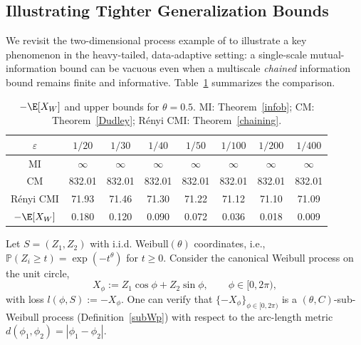 \documentclass[11pt]{article}
\begin{document}
\subsection{Illustrating Tighter Generalization Bounds}\label{sec:tightness}


We revisit the two-dimensional process example of
\citet{asadi2018chaining} to illustrate a key phenomenon in the heavy-tailed,
data-adaptive setting: a single-scale mutual-information bound can be vacuous
even when a multiscale \emph{chained} information bound remains finite and
informative. Table~\ref{tab:bounds} summarizes the comparison.


\begin{table}[h]
\centering
\caption{\small $-\E[X_W]$ and upper bounds for $\theta=0.5$.
MI: Theorem~\ref{infob}; CM: Theorem~\ref{Dudley}; 
R\'enyi CMI: Theorem~\ref{chaining}.}\label{tab:bounds}
\renewcommand{\arraystretch}{1}
\begin{tabular}{c|ccccccc}
\hline
\(\varepsilon\) & $1/20$ & $1/30$ & $1/40$ & $1/50$ & $1/100$ & $1/200$ & $1/400$ \\
\hline
MI & $\infty$ & $\infty$ & $\infty$ & $\infty$ & $\infty$ & $\infty$ & $\infty$ \\
CM & 832.01 & 832.01 & 832.01 & 832.01 & 832.01 & 832.01 & 832.01 \\
R\'enyi CMI & 71.93 & 71.46 & 71.30 & 71.22 & 71.12 & 71.10 & 71.09 \\
$-\E[X_W]$ & 0.180 & 0.120 & 0.090 & 0.072 & 0.036 & 0.018 & 0.009 \\
\hline
\end{tabular}
\end{table}


Let $S=(Z_1,Z_2)$ with i.i.d. Weibull$(\theta)$ coordinates, i.e.,
$\mathbb{P}(Z_i\ge t)=\exp(-t^\theta)$ for $t\ge 0$.
Consider the canonical Weibull process on the unit circle,
\[
X_\phi := Z_1\cos\phi + Z_2\sin\phi,\qquad \phi\in[0,2\pi),
\]
with loss $l(\phi,S):=-X_\phi$.
One can verify that $\{-X_\phi\}_{\phi\in[0,2\pi)}$ is a $(\theta,C)$-sub-Weibull process (Definition~\ref{subWp}) with respect to the arc-length metric $d(\phi_1,\phi_2)=|\phi_1-\phi_2|$.

\end{document}
